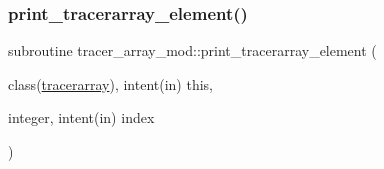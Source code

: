 \mbox{\label{namespacetracer__array__mod_ac3b3896987e589190c759e92e95e05af}} 
\subsubsection{\texorpdfstring{print\+\_\+tracerarray\+\_\+element()}{print\_tracerarray\_element()}}
{\footnotesize\ttfamily subroutine tracer\+\_\+array\+\_\+mod\+::print\+\_\+tracerarray\+\_\+element (\begin{DoxyParamCaption}\item[{class(\hyperlink{structtracer__array__mod_1_1tracerarray}{tracerarray}), intent(in)}]{this,  }\item[{integer, intent(in)}]{index }\end{DoxyParamCaption})\hspace{0.3cm}{\ttfamily [private]}}

